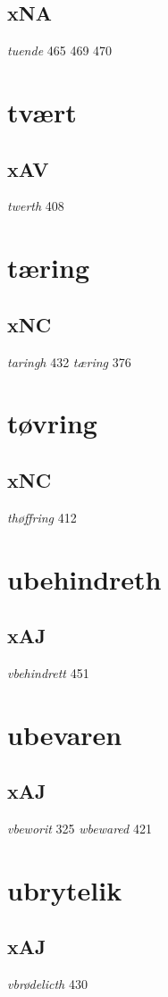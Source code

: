 \documentclass[a4paper,twocolumn]{article}
\begin{document}
\subsection{xNA}
\label{sec:org61d1bf3}
\emph{tuende} 465 469 470 
\section{tvært}
\label{sec:org63fec3c}
\subsection{xAV}
\label{sec:org017b627}
\emph{twerth} 408 
\section{tæring}
\label{sec:org056610b}
\subsection{xNC}
\label{sec:org68d3b9d}
\emph{taringh} 432 \emph{tæring} 376 
\section{tøvring}
\label{sec:org23dec4f}
\subsection{xNC}
\label{sec:orgcf3f1d2}
\emph{thøffring} 412 
\section{ubehindreth}
\label{sec:org23b5545}
\subsection{xAJ}
\label{sec:orgc13da9d}
\emph{vbehindrett} 451 
\section{ubevaren}
\label{sec:org4fb01f3}
\subsection{xAJ}
\label{sec:org2691764}
\emph{vbeworit} 325 \emph{wbewared} 421 
\section{ubrytelik}
\label{sec:org2656ecd}
\subsection{xAJ}
\label{sec:org77e7c93}
\emph{vbrødelicth} 430 
\end{document}
